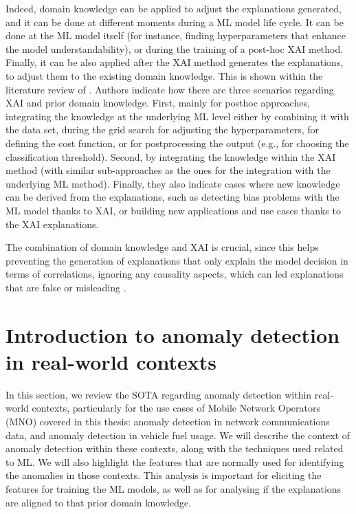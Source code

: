 Indeed, domain knowledge can be applied to adjust the explanations generated, and it can be done at different moments during a ML model life cycle. It can be done at the ML model itself (for instance, finding hyperparameters that enhance the model understandability), or during the training of a post-hoc XAI method. Finally, it can be also applied after the XAI method generates the explanations, to adjust them to the existing domain knowledge. This is shown within the literature review of \parencite{beckh2021explainable}. Authors indicate how there are three scenarios regarding XAI and prior domain knowledge. First, mainly for posthoc approaches, integrating the knowledge at the underlying ML level either by combining it with the data set, during the grid search for adjusting the hyperparameters, for defining the cost function, or for postprocessing the output (e.g., for choosing the classification threshold). Second, by integrating the knowledge within the XAI method (with similar sub-approaches as the ones for the integration with the underlying ML method). Finally, they also indicate cases where new knowledge can be derived from the explanations, such as detecting bias problems with the ML model thanks to XAI, or building new applications and use cases thanks to the XAI explanations.

The combination of domain knowledge and XAI is crucial, since this helps preventing the generation of explanations that only explain the model decision in terms of correlations, ignoring any causality aspects, which can led explanations that are false or misleading \parencite{holzinger2019causability}.

\section{Introduction to anomaly detection in real-world contexts}\label{sec:ch2s-sota-specific}

In this section, we review the SOTA regarding anomaly detection within real-world contexts, particularly for the use cases of Mobile Network Operators (MNO) covered in this thesis: anomaly detection in network communications data, and anomaly detection in vehicle fuel usage. We will describe the context of anomaly detection within these contexts, along with the techniques used related to ML. We will also highlight the features that are normally used for identifying the anomalies in those contexts. This analysis is important for eliciting the features for training the ML models, as well as for analysing if the explanations are aligned to that prior domain knowledge.

